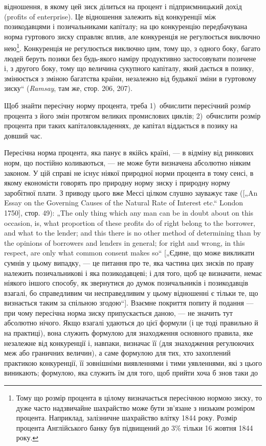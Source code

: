 \parcont{}  %
відношення, в якому цей зиск ділиться на процент і підприємницький
дохід (profits of enterprise). Це відношення залежить
від конкуренції між позикодавцями і позичальниками капіталу;
на цю конкуренцію передбачувана норма гуртового зиску
справляє вплив, але конкуренція не регулюється виключно нею\footnote{
Тому що розмір процента в цілому визначається пересічною нормою
зиску, то дуже часто надзвичайне шахрайство може бути зв’язане з низьким
розміром процента. Наприклад, залізничне шахрайство влітку 1844 року. Розмір
процента Англійського банку був підвищений до 3\% тільки 16 жовтня
1844 року.
}.
Конкуренція не регулюється виключно цим, тому що, з одного
боку, багато людей беруть позики без будь-якого наміру продуктивно
застосовувати позичене і, з другого боку, тому що величина
сукупного капіталу, який дається в позику, змінюється з зміною
багатства країни, незалежно від будьякої зміни в гуртовому
зиску“ (\emph{Ramsay}, там же, стор. 206, 207).

Щоб знайти пересічну норму процента, треба 1)~обчислити
пересічний розмір процента з його змін протягом великих промислових
циклів; 2)~обчислити розмір процента при таких капіталовкладеннях,
де капітал віддається в позику на довший час.

Пересічна норма процента, яка панує в якійсь країні, — в відміну
від ринкових норм, що постійно коливаються, — не може бути
визначена абсолютно ніяким законом. У цій справі не існує ніякої
природної норми процента в тому сенсі, в якому економісти
говорять про природну норму зиску і природну норму заробітної
плати. З приводу цього вже Мессі цілком слушно зауважує
таке ([„An Essay on the Governing Causes of the Natural Rate of Interest
etc.“ London 1750], стор. 49): „The only thing which any man can
be in doubt about on this occasion, is, what proportion of these profits
do of right belong to the borrower, and what to the lender; and this there
is no other method of determining than by the opinions of borrowers
and lenders in general; for right and wrong, in this respect, are
only what common consent makes so“ [„Єдине, що може викликати
сумнів у цьому випадку, — це питання про те, яка частина цих
зисків по праву належить позичальникові і яка позикодавцеві;
і для того, щоб це визначити, немає ніякого іншого способу, як
звернутися до думок позичальників і позикодавців взагалі, бо
справедливим чи несправедливим у цьому відношенні є тільки те,
що визнається таким за спільною згодою“]. Взаємне покриття
попиту й подання — при чому пересічна норма зиску припускається
даною, — не значить тут абсолютно нічого. Якщо взагалі
удаються до цієї формули (і це тоді правильно й на практиці),
вона служить формулою для знаходження основного правила,
яке незалежне від конкуренції і, навпаки, визначає її (для знаходження
регулюючих меж або граничних величин), а саме формулою
для тих, хто захоплений практикою конкуренції, її зовнішніми
виявленнями і тими уявленнями, які з цього виникають; формулою,
яка служить їм для того, щоб прийти хоча б знов таки до
\parbreak{}  %
